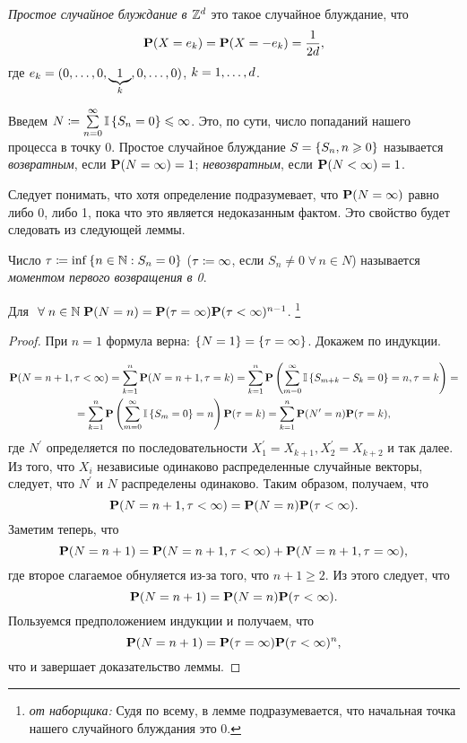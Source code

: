 \begin{df}
	\textit{Простое случайное блуждание в $\mathbb{Z}^d$} \td это такое случайное блуждание, что
	$$
		\mathbf{P}(X = e_k) = \mathbf{P}(X = -e_k) = \frac1{2d},
	$$
	где $e_k = (0 ,\ldots, 0, \underbrace{1}_k, 0 ,\ldots, 0)$, $k = 1 ,\ldots, d$.
\end{df}

\begin{df}
	Введем $N \coloneqq \sum\limits_{n=0}^{\infty} \mathbb{I} \left\{S_n = 0\right\} \leqslant \infty$.
	Это, по сути, число попаданий нашего процесса в точку $0$.
	Простое случайное блуждание $S = \left\{S_n, n \geqslant 0\right\}$ называется \textit{возвратным},
	если $\mathbf{P}(N = \infty) = 1$; \textit{невозвратным}, если $\mathbf{P}(N < \infty) = 1$.
\end{df}

\begin{note}
	Следует понимать, что хотя определение подразумевает, что $\mathbf{P}(N = \infty)$ равно либо 0, либо 1,
	пока что это является недоказанным фактом.
	Это свойство будет следовать из следующей леммы.
\end{note}
\begin{df}
	Число $\tau \coloneqq \inf\left\{ n \in \mathbb{N} : S_{n} = 0\right\}$ ($\tau \coloneqq \infty$,
	если $S_{n} \ne 0 \; \forall\, n \in N$) называется \textit{моментом первого возвращения в 0}.
\end{df}

\begin{lemma}
	Для $ ~\forall\; n \in \mathbb{N} \; \mathbf{P}(N = n) = \mathbf{P}(\tau = \infty)\mathbf{P}(\tau < \infty)^{n-1}$.
		\footnote{\textit{от наборщика:} Судя по всему, в лемме подразумевается,
			что начальная точка нашего случайного блуждания \td это 0.}
\end{lemma}

\begin{proof}
	При $n = 1$ формула верна: $\left\{ N = 1\right\} = \left\{ \tau = \infty\right\}$.
Докажем по индукции.

	\begin{gather*}
		\mathbf{P}(N = n+1, \tau < \infty) =
		\sum\limits_{k=1}^{n} \mathbf{P}(N = n+1, \tau = k) 
	=	\sum\limits_{k=1}^{n} \mathbf{P}\left( \sum_{m=0}^{\infty} \mathbb{I} \left\{ S_{m+k} - S_k = 0 \right\} = n, \tau = k\right) = \\
	=	\sum\limits_{k=1}^{n} \mathbf{P} \left( \sum_{m=0}^{\infty} \mathbb{I} \left\{ S_m = 0\right\} = n\right) \mathbf{P}(\tau = k) 
	=	\sum\limits_{k=1}^{n} \mathbf{P}(N^{\prime} = n)\mathbf{P}(\tau = k),
	\end{gather*}
	где $N^{\prime}$ определяется по последовательности
	$X_1^{\prime} = X_{k+1}, X_{2}^{\prime} = X_{k+2}$ и так далее.
	Из того, что $X_i$ \td независиые одинаково распределенные случайные векторы,
	следует, что $N^{\prime}$ и $N$ распределены одинаково.
	Таким образом, получаем, что
	$$
		\mathbf{P}(N = n+1, \tau < \infty) = \mathbf{P}(N = n)\mathbf{P}(\tau < \infty).
	$$
	Заметим теперь, что
	$$
		\mathbf{P}(N = n+1) = \mathbf{P}(N = n+1, \tau < \infty) + \mathbf{P}(N = n+1, \tau = \infty),
	$$
	где второе слагаемое обнуляется из-за того, что $n+1 \ge 2$.
	Из этого следует, что
	$$
		\mathbf{P}(N = n+1) = \mathbf{P}(N = n)\mathbf{P}(\tau < \infty).
	$$
		Пользуемся предположением индукции и получаем, что
	$$
		\mathbf{P}(N = n+1) = \mathbf{P}(\tau = \infty)\mathbf{P}(\tau < \infty)^n,
	$$
	что и завершает доказательство леммы.
\end{proof}

